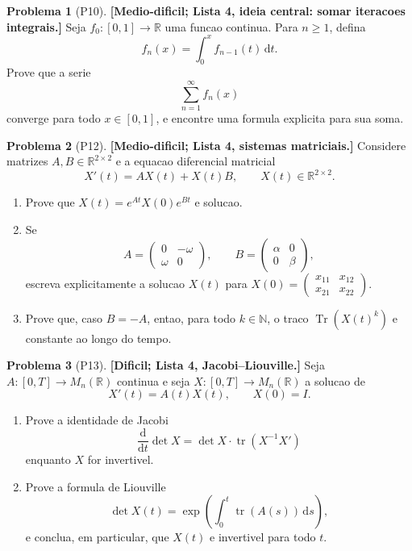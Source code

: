 \documentclass[10pt,a4paper]{amsart}
\newcommand{\R}{\mathbb{R}}
\renewcommand{\d}{\mathrm{d}}
\theoremstyle{definition}
\newtheorem{problema}{Problema}
\begin{document}
\begin{problema}[P10]
\textbf{[Medio-dificil; Lista 4, ideia central: somar iteracoes integrais.]}
Seja $f_0:[0,1]\to\R$ uma funcao continua. Para $n\ge 1$, defina
\[
    f_n(x)=\int_0^x f_{n-1}(t)\,\d t.
\]
Prove que a serie
\[
    \sum_{n=1}^{\infty} f_n(x)
\]
converge para todo $x\in[0,1]$, e encontre uma formula explicita para sua
soma.
\end{problema}

\begin{problema}[P12]
\textbf{[Medio-dificil; Lista 4, sistemas matriciais.]}
Considere matrizes $A,B\in\R^{2\times2}$ e a equacao diferencial matricial
\[
    X'(t)=AX(t)+X(t)B,\qquad X(t)\in\R^{2\times2}.
\]
\begin{enumerate}[label=(\alph*)]
    \item Prove que $X(t)=e^{At}X(0)e^{Bt}$ e solucao.
    \item Se
    \[
        A=\begin{pmatrix}0&-\omega\\ \omega&0\end{pmatrix},
        \qquad
        B=\begin{pmatrix}\alpha&0\\0&\beta\end{pmatrix},
    \]
    escreva explicitamente a solucao $X(t)$ para
    $X(0)=\begin{pmatrix}x_{11}&x_{12}\\x_{21}&x_{22}\end{pmatrix}$.
    \item Prove que, caso $B=-A$, entao, para todo $k\in\mathbb{N}$, o traco
    $\operatorname{Tr}(X(t)^k)$ e constante ao longo do tempo.
\end{enumerate}
\end{problema}

\begin{problema}[P13]
\textbf{[Dificil; Lista 4, Jacobi--Liouville.]}
Seja $A:[0,T]\to M_n(\R)$ continua e seja $X:[0,T]\to M_n(\R)$ a solucao de
\[
    X'(t)=A(t)X(t),
    \qquad X(0)=I.
\]
\begin{enumerate}[label=(\alph*)]
    \item Prove a identidade de Jacobi
    \[
        \frac{\d}{\d t}\det X=\det X\cdot\operatorname{tr}(X^{-1}X')
    \]
    enquanto $X$ for invertivel.
    \item Prove a formula de Liouville
    \[
        \det X(t)=\exp\left(\int_0^t \operatorname{tr}(A(s))\,\d s\right),
    \]
    e conclua, em particular, que $X(t)$ e invertivel para todo $t$.
\end{enumerate}
\end{problema}
\end{document}
